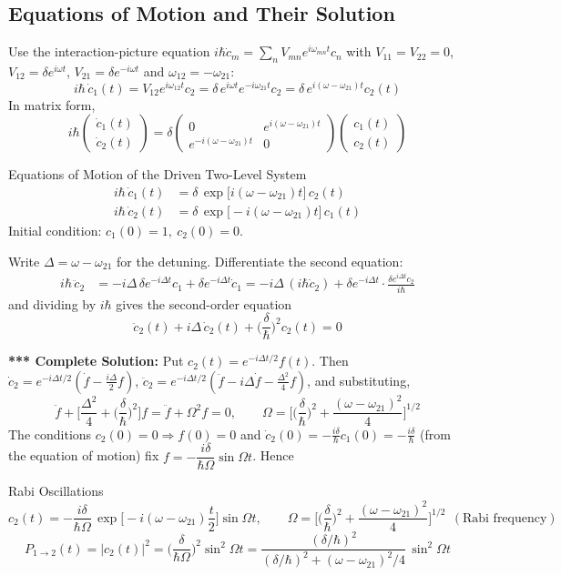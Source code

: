 \documentclass[11pt,a4paper]{article}
\begin{document}
\subsection{Equations of Motion and Their Solution}
Use the interaction-picture equation $i\hbar\dot c_m=\sum_nV_{mn}e^{i\omega_{mn}t}c_n$ with $V_{11}=V_{22}=0$, $V_{12}=\delta e^{i\omega t}$, $V_{21}=\delta e^{-i\omega t}$ and $\omega_{12}=-\omega_{21}$:
\[
i\hbar\,\dot c_1(t) = V_{12}e^{i\omega_{12}t}c_2 = \delta\,e^{i\omega t}e^{-i\omega_{21}t}c_2 = \delta\,e^{i(\omega-\omega_{21})t}c_2(t)
\]
In matrix form,
\[
i\hbar\begin{pmatrix}\dot c_1(t)\\ \dot c_2(t)\end{pmatrix}
= \delta\begin{pmatrix}0&e^{i(\omega-\omega_{21})t}\\ e^{-i(\omega-\omega_{21})t}&0\end{pmatrix}\begin{pmatrix}c_1(t)\\ c_2(t)\end{pmatrix}
\]
\begin{thm}{Equations of Motion of the Driven Two-Level System}
\begin{align*}
i\hbar\,\dot c_1(t) &= \delta\,\exp\big[i(\omega-\omega_{21})t\big]\,c_2(t)\\
i\hbar\,\dot c_2(t) &= \delta\,\exp\big[-i(\omega-\omega_{21})t\big]\,c_1(t)
\end{align*}
Initial condition: $c_1(0)=1,\ c_2(0)=0$.
\end{thm}

Write $\Delta=\omega-\omega_{21}$ for the detuning. Differentiate the second equation:
\begin{align*}
i\hbar\,\ddot c_2 &= -i\Delta\,\delta e^{-i\Delta t}c_1 + \delta e^{-i\Delta t}\dot c_1
= -i\Delta\,(i\hbar\dot c_2) + \delta e^{-i\Delta t}\cdot\frac{\delta e^{i\Delta t}c_2}{i\hbar}
\end{align*}
and dividing by $i\hbar$ gives the second-order equation
\[
\ddot c_2(t) + i\Delta\,\dot c_2(t) + \Big(\frac\delta\hbar\Big)^2c_2(t)=0
\]

\textbf{*** Complete Solution:} Put $c_2(t)=e^{-i\Delta t/2}f(t)$. Then $\dot c_2=e^{-i\Delta t/2}(\dot f-\tfrac{i\Delta}2f)$, $\ddot c_2=e^{-i\Delta t/2}(\ddot f-i\Delta\dot f-\tfrac{\Delta^2}4f)$, and substituting,
\[
\ddot f + \Big[\frac{\Delta^2}{4}+\Big(\frac\delta\hbar\Big)^2\Big]f = \ddot f+\Omega^2f=0, \qquad
\Omega=\Big[\Big(\frac\delta\hbar\Big)^2+\frac{(\omega-\omega_{21})^2}4\Big]^{1/2}
\]
The conditions $c_2(0)=0\Rightarrow f(0)=0$ and $\dot c_2(0)=-\frac{i\delta}{\hbar}c_1(0)=-\frac{i\delta}\hbar$ (from the equation of motion) fix $f=-\dfrac{i\delta}{\hbar\Omega}\sin\Omega t$. Hence
\begin{thm}{Rabi Oscillations}
\[
c_2(t) = -\frac{i\delta}{\hbar\Omega}\,\exp\Big[-i(\omega-\omega_{21})\frac t2\Big]\sin\Omega t, \qquad
\Omega=\Big[\Big(\frac\delta\hbar\Big)^2+\frac{(\omega-\omega_{21})^2}4\Big]^{1/2}\ \ (\text{Rabi frequency})
\]
\[
P_{1\to2}(t)=|c_2(t)|^2 = \Big(\frac{\delta}{\hbar\Omega}\Big)^2\sin^2\Omega t
= \frac{(\delta/\hbar)^2}{(\delta/\hbar)^2+(\omega-\omega_{21})^2/4}\,\sin^2\Omega t
\]
\end{thm}
\end{document}
